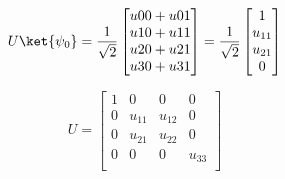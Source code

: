 \begin{equation}
    U\ket{\psi_0} =
    \frac{1}{\sqrt{2}}
    \begin{bmatrix}
        u00 + u01 \\
        u10 + u11 \\
        u20 + u21 \\
        u30 + u31 \\
    \end{bmatrix}
    =
    \frac{1}{\sqrt{2}}
    \begin{bmatrix}
        1 \\
        u_{11} \\
        u_{21} \\
        0 \\
    \end{bmatrix}
\end{equation}

\begin{equation}
    U=
    \begin{bmatrix}
        1 & 0 & 0  & 0 \\
        0 & u_{11} & u_{12} & 0 \\
        0 & u_{21} & u_{22} & 0 \\
        0 & 0 & 0  & u_{33} \\
    \end{bmatrix}
\end{equation}


